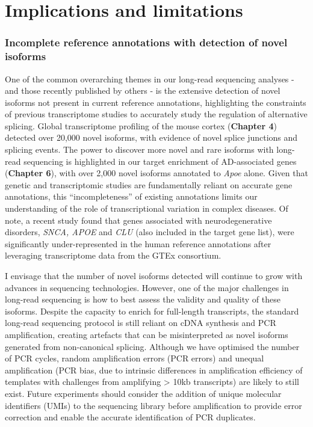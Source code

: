 \section{Implications and limitations}

\subsubsection{Incomplete reference annotations with detection of novel isoforms} 
\label{ch7: artefacts}
One of the common overarching themes in our long-read sequencing analyses - and those recently published by others - is the extensive detection of novel isoforms not present in current reference annotations, highlighting the constraints of previous transcriptome studies to accurately study the regulation of alternative splicing. Global transcriptome profiling of the mouse cortex (\textbf{Chapter 4}) detected over 20,000 novel isoforms, with evidence of novel splice junctions and splicing events. The power to discover more novel and rare isoforms with long-read sequencing is highlighted in our target enrichment of AD-associated genes (\textbf{Chapter 6}), with over 2,000 novel isoforms annotated to \textit{Apoe} alone. Given that genetic and transcriptomic studies are fundamentally reliant on accurate gene annotations, this “incompleteness” of existing annotations limits our understanding of the role of transcriptional variation in complex diseases. Of note, a recent study found that genes associated with neurodegenerative disorders, \textit{SNCA, APOE} and \textit{CLU} (also included in the target gene list), were significantly under-represented in the human reference annotations after leveraging transcriptome data from the GTEx consortium\cite{Zhang2020b}.  

I envisage that the number of novel isoforms detected will continue to grow with advances in sequencing technologies. However, one of the major challenges in long-read sequencing is how to best assess the validity and quality of these isoforms. Despite the capacity to enrich for full-length transcripts, the standard long-read sequencing protocol is still reliant on cDNA synthesis and PCR amplification, creating artefacts that can be misinterpreted as novel isoforms generated from non-canonical splicing. Although we have optimised the number of PCR cycles, random amplification errors (PCR errors) and unequal amplification (PCR bias, due to intrinsic differences in amplification efficiency of templates with challenges from amplifying > 10kb transcripts) are likely to still exist. Future experiments should consider the addition of unique molecular identifiers (UMIs) to the sequencing library before amplification to provide error correction and enable the accurate identification of PCR duplicates\cite{Fu2018}.  


